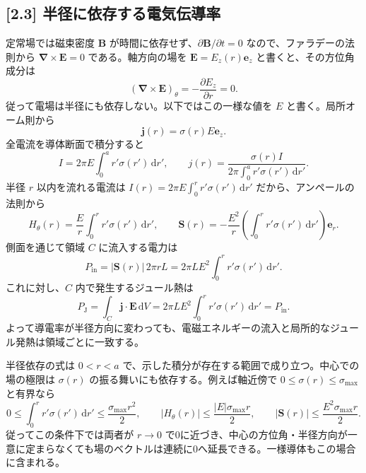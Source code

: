 \documentclass[11pt,a4paper]{article}
\begin{document}
\subsection*{[2.3] 半径に依存する電気伝導率}
定常場では磁束密度 $\boldsymbol{B}$ が時間に依存せず、$\partial\boldsymbol{B}/\partial t=0$ なので、ファラデーの法則から
$\boldsymbol{\nabla}\times\boldsymbol{E}=0$ である。軸方向の場を
$\boldsymbol{E}=E_z(r)\boldsymbol{e}_z$ と書くと、その方位角成分は
\begin{equation}
  (\boldsymbol{\nabla}\times\boldsymbol{E})_\theta
  =-\frac{\partial E_z}{\partial r}=0.
\end{equation}
従って電場は半径にも依存しない。以下ではこの一様な値を $E$ と書く。局所オーム則から
\begin{equation}
  \boldsymbol{j}(r)=\sigma(r)E\boldsymbol{e}_z.
\end{equation}
全電流を導体断面で積分すると
\begin{equation}
  I=2\pi E\int_0^a r'\sigma(r')\,\mathrm{d}r',
  \qquad
  \boxed{j(r)=\frac{\sigma(r)I}
  {2\pi\displaystyle\int_0^a r'\sigma(r')\,\mathrm{d}r'}.}
\end{equation}
半径 $r$ 以内を流れる電流は $I(r)=2\pi E\int_0^r r'\sigma(r')\,\mathrm{d}r'$ だから、アンペールの法則から
\begin{equation}
  H_\theta(r)=\frac{E}{r}\int_0^r r'\sigma(r')\,\mathrm{d}r',
  \qquad
  \boldsymbol{S}(r)=-\frac{E^2}{r}\left(\int_0^r r'\sigma(r')\,\mathrm{d}r'\right)\boldsymbol{e}_r.
\end{equation}
側面を通じて領域 $C$ に流入する電力は
\begin{equation}
  P_{\mathrm{in}}=|\boldsymbol{S}(r)|\,2\pi rL
  =2\pi LE^2\int_0^r r'\sigma(r')\,\mathrm{d}r'.
\end{equation}
これに対し、$C$ 内で発生するジュール熱は
\begin{equation}
  P_{\mathrm{J}}=\int_C\boldsymbol{j}\cdot\boldsymbol{E}\,\mathrm{d}V
  =2\pi LE^2\int_0^r r'\sigma(r')\,\mathrm{d}r'=P_{\mathrm{in}}.
\end{equation}
よって導電率が半径方向に変わっても、電磁エネルギーの流入と局所的なジュール発熱は領域ごとに一致する。

半径依存の式は $0<r<a$ で、示した積分が存在する範囲で成り立つ。中心での場の極限は $\sigma(r)$ の振る舞いにも依存する。例えば軸近傍で $0\le\sigma(r)\le\sigma_{\max}$ と有界なら
\begin{equation}
  0\le\int_0^r r'\sigma(r')\,\mathrm{d}r'
  \le\frac{\sigma_{\max}r^2}{2},\qquad
  |H_\theta(r)|\le\frac{|E|\sigma_{\max}r}{2},\qquad
  |\boldsymbol S(r)|\le\frac{E^2\sigma_{\max}r}{2}.
\end{equation}
従ってこの条件下では両者が $r\to0$ で0に近づき、中心の方位角・半径方向が一意に定まらなくても場のベクトルは連続に0へ延長できる。一様導体もこの場合に含まれる。
\end{document}
